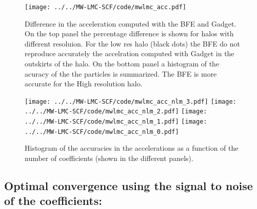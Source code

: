 \documentclass[14pt]{article}
\begin{document}







\begin{figure}[H]
  \centering
  \texttt{[image: ../../MW-LMC-SCF/code/mwlmc\_acc.pdf]}
  \caption{Difference in the acceleration computed with the BFE and Gadget. On
  the top panel the percentage difference is shown for halos with different
  resoluion. For the low res halo (black dots) the BFE do not reproduce
  accurately the accelration computed with Gadget in the outskirts of the halo.
  On the bottom panel a histogram of the acuracy of the the particles is
  summarized. The BFE is more accurate for the High resolution halo.}
\end{figure}


\begin{figure}[H]
  \centering
  \texttt{[image: ../../MW-LMC-SCF/code/mwlmc\_acc\_nlm\_3.pdf]}
  \texttt{[image: ../../MW-LMC-SCF/code/mwlmc\_acc\_nlm\_2.pdf]}
  \texttt{[image: ../../MW-LMC-SCF/code/mwlmc\_acc\_nlm\_1.pdf]}
  \texttt{[image: ../../MW-LMC-SCF/code/mwlmc\_acc\_nlm\_0.pdf]}
  \caption{Histogram of the accuracies in the accelerations as a function of the
  number of coefficients (shown in the different panels).}
\end{figure}



\subsection{Optimal convergence using the signal to noise of the coefficients:}
\end{document}
